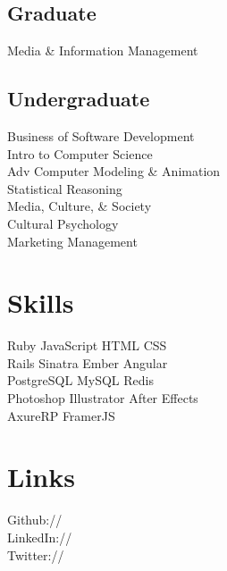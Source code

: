 \documentclass[]{deedy-resume}
\begin{document}
\begin{minipage}[t]{0.33\textwidth}
\subsection{Graduate}
Media \& Information Management \\
\sectionsep

\subsection{Undergraduate}
Business of Software Development \\
Intro to Computer Science \\
Adv Computer Modeling \& Animation \\
Statistical Reasoning \\
Media, Culture, \& Society \\
Cultural Psychology \\
Marketing Management
\sectionsep


\section{Skills}
Ruby \textbullet{}   JavaScript \textbullet{} HTML \textbullet{} CSS \\
Rails \textbullet{} Sinatra \textbullet{} Ember \textbullet{} Angular \\
PostgreSQL \textbullet{} MySQL \textbullet{} Redis \\
Photoshop \textbullet{} Illustrator \textbullet{} After Effects \\
AxureRP \textbullet{} FramerJS \\
\sectionsep


\section{Links} 
Github:// \href{https://github.com/mopineyro}{} \\
LinkedIn://  \href{https://www.linkedin.com/in/manuelopineyro}{} \\
Twitter://  \href{https://twitter.com/mopineyro}{}
\sectionsep

%
%

\end{minipage} 
\end{document}
